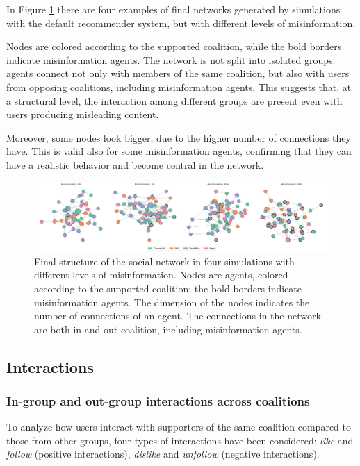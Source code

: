 \medskip
In Figure \ref{fig:network_structure} there are four examples of final networks generated by simulations with the default recommender system, but with different levels of misinformation.

Nodes are colored according to the supported coalition, while the bold borders indicate misinformation agents.
The network is not split into isolated groups: agents connect not only with members of the same coalition, but also with users from opposing coalitions, including misinformation agents.
This suggests that, at a structural level, the interaction among different groups are present even with users producing misleading content.

Moreover, some nodes look bigger, due to the higher number of connections they have.
This is valid also for some misinformation agents, confirming that they can have a realistic behavior and become central in the network.

\begin{figure}[h]
    \centering
    \includegraphics[width=1\linewidth]{Images/Network/graphs_DefaultRecSys.png}
    \caption{Final structure of the social network in four simulations with different levels of misinformation. 
    Nodes are agents, colored according to the supported coalition; the bold borders indicate misinformation agents. 
    The dimension of the nodes indicates the number of connections of an agent.
    The connections in the network are both in and out coalition, including misinformation agents.}
    \label{fig:network_structure}
\end{figure}


\subsection{Interactions}
\subsubsection{In-group and out-group interactions across coalitions}
To analyze how users interact with supporters of the same coalition compared to those from other groups, four types of interactions have been considered: \textit{like} and \textit{follow} (positive interactions), \textit{dislike} and \textit{unfollow} (negative interactions).


